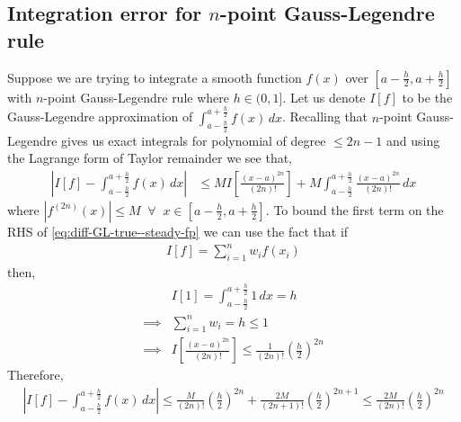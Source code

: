 \subsection{Integration error for \texorpdfstring{$n$}{Lg}-point Gauss-Legendre rule}\label{ssec-error-GL--steady-fp}
Suppose we are trying to integrate a smooth function $f(x)$ over $\left[a-\frac{h}{2}, a+\frac{h}{2}\right]$ with $n$-point Gauss-Legendre rule where $h\in(0, 1]$. Let us denote $I[f]$ to be the Gauss-Legendre approximation of $\int_{a-\frac{h}{2}}^{a+\frac{h}{2}} f(x)\,dx$. Recalling that $n$-point Gauss-Legendre gives us exact integrals for polynomial of degree $\le 2n-1$ and using the Lagrange form of Taylor remainder we see that, 
\begin{align}
    \left|I[f]-\int_{a-\frac{h}{2}}^{a+\frac{h}{2}} f(x)\,dx\right| &\le MI\left[\frac{(x-a)^{2n}}{(2n)!}\right]+M\int_{a-\frac{h}{2}}^{a+\frac{h}{2}} \frac{(x-a)^{2n}}{(2n)!}\,dx\label{eq:diff-GL-true--steady-fp}
\end{align}
where $|f^{(2n)}(x)|\le M\;\;\forall\;\;x\in\left[a-\frac{h}{2}, a+\frac{h}{2}\right]$. To bound the first term on the RHS of \eqref{eq:diff-GL-true--steady-fp} we can use the fact that if 
\begin{align}
    I[f] = \sum_{i=1}^nw_if(x_i)
\end{align}
then,
\begin{align}
    &I[1] = \int_{a-\frac{h}{2}}^{a+\frac{h}{2}} 1 \,dx = h\\
    \implies&\sum_{i=1}^nw_i = h\le1\\
    \implies&I\left[\frac{(x-a)^{2n}}{(2n)!}\right]\le\frac{1}{(2n)!}\left(\frac{h}{2}\right)^{2n}
\end{align}
Therefore,
\begin{align}
    \left|I[f]-\int_{a-\frac{h}{2}}^{a+\frac{h}{2}} f(x)\,dx\right|\le \frac{M}{(2n)!}\left(\frac{h}{2}\right)^{2n}+\frac{2M}{(2n+1)!}\left(\frac{h}{2}\right)^{2n+1}\le\frac{2M}{(2n)!}\left(\frac{h}{2}\right)^{2n}
\end{align}
 